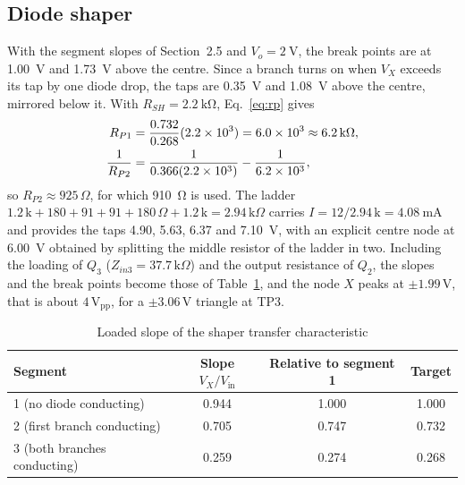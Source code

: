 \documentclass[12pt,a4paper]{article}
\begin{document}
	\subsection{Diode shaper}
	With the segment slopes of Section~2.5 and $V_o=\SI{2}{\volt}$, the break points are at \SI{1.00}{\volt} and \SI{1.73}{\volt} above the centre. Since a branch turns on when $V_X$ exceeds its tap by one diode drop, the taps are \SI{0.35}{\volt} and \SI{1.08}{\volt} above the centre, mirrored below it. With $R_{SH}=\SI{2.2}{\kilo\ohm}$, Eq.~\eqref{eq:rp} gives
	\begin{align}
		R_{P1}&=\frac{0.732}{0.268}(2.2\times10^{3})=6.0\times10^{3}\approx6.2\,\mathrm{k}\Omega,\notag\\
		\frac{1}{R_{P2}}&=\frac{1}{0.366(2.2\times10^{3})}-\frac{1}{6.2\times10^{3}},
		\label{eq:calc-rp}
	\end{align}
	so $R_{P2}\approx925\,\Omega$, for which \SI{910}{\ohm} is used. The ladder $1.2\,\mathrm{k}+180+91+91+180\,\Omega+1.2\,\mathrm{k}=2.94\,\mathrm{k}\Omega$ carries $I=12/2.94\,\mathrm{k}=\SI{4.08}{\milli\ampere}$ and provides the taps 4.90, 5.63, 6.37 and \SI{7.10}{\volt}, with an explicit centre node at \SI{6.00}{\volt} obtained by splitting the middle resistor of the ladder in two. Including the loading of $Q_3$ ($Z_{in3}=37.7\,\mathrm{k}\Omega$) and the output resistance of $Q_2$, the slopes and the break points become those of Table~\ref{tab:slopes}, and the node $X$ peaks at $\pm1.99\,\mathrm{V}$, that is about $4\,\mathrm{V_{pp}}$, for a $\pm3.06\,\mathrm{V}$ triangle at TP3.

	\begin{table}[H]
		\centering
		\caption{Loaded slope of the shaper transfer characteristic}
		\label{tab:slopes}
		\renewcommand{\arraystretch}{1.25}
		\begin{tabular}{|l|c|c|c|}
			\hline
			\rowcolor{black!12}\textbf{Segment} & \textbf{Slope $V_X/V_{\mathrm{in}}$} & \textbf{Relative to segment 1} & \textbf{Target} \\
			\hline
			1 (no diode conducting) & 0.944 & 1.000 & 1.000 \\
			\hline
			2 (first branch conducting) & 0.705 & 0.747 & 0.732 \\
			\hline
			3 (both branches conducting) & 0.259 & 0.274 & 0.268 \\
			\hline
		\end{tabular}
	\end{table}
\end{document}
